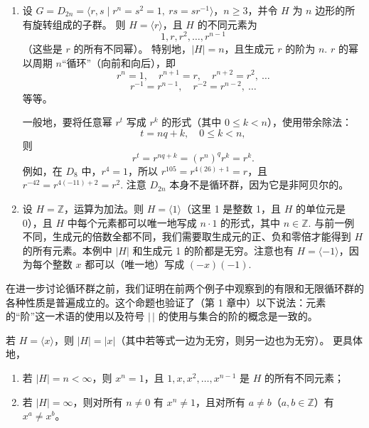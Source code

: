 \begin{example}
\begin{enumerate}[label=(\arabic*)]
\item 设 \( G = D_{2n} = \langle r, s \mid r^n = s^2 = 1,\ rs = sr^{-1} \rangle \)，\( n \geq 3 \)，并令 \( H \) 为 \( n \) 边形的所有旋转组成的子群。
则 \( H = \langle r \rangle \)，且 \( H \) 的不同元素为
\[
1, r, r^2, \ldots, r^{n-1}
\]
（这些是 \( r \) 的所有不同幂）。
特别地，\( |H| = n \)，且生成元 \( r \) 的阶为 \( n \). 
\( r \) 的幂以周期 \( n \)“循环”（向前和向后），即
\[
r^n = 1,\quad r^{n+1} = r,\quad r^{n+2} = r^2,\ \ldots
\]
\[
r^{-1} = r^{n-1},\quad r^{-2} = r^{n-2},\ \ldots
\]
等等。

一般地，要将任意幂 \( r^t \) 写成 \( r^k \) 的形式（其中 \( 0 \leq k < n \)），使用带余除法：
\[
t = nq + k,\quad 0 \leq k < n,
\]
则
\[
r^t = r^{nq+k} = (r^n)^q r^k = r^k.
\]
例如，在 \( D_8 \) 中，\( r^4 = 1 \)，所以 \( r^{105} = r^{4(26)+1} = r \)，且 \( r^{-42} = r^{4(-11)+2} = r^2 \). 注意 \( D_{2n} \) 本身不是循环群，因为它是非阿贝尔的。

\item 设 \( H = \mathbb{Z} \)，运算为加法。则 \( H = \langle 1 \rangle \)（这里 1 是整数 1，且 \( H \) 的单位元是 0），且 \( H \) 中每个元素都可以唯一地写成 \( n \cdot 1 \) 的形式，其中 \( n \in \mathbb{Z} \). 与前一例不同，生成元的倍数全都不同，我们需要取生成元的正、负和零倍才能得到 \( H \) 的所有元素。本例中 \( |H| \) 和生成元 1 的阶都是无穷。注意也有 \( H = \langle -1 \rangle \)，因为每个整数 \( x \) 都可以（唯一地）写成 \( (-x)(-1) \).
\end{enumerate}
\end{example}

在进一步讨论循环群之前，我们证明在前两个例子中观察到的有限和无限循环群的各种性质是普遍成立的。这个命题也验证了（第 1 章中）以下说法：元素的“阶”这一术语的使用以及符号 \(|\,|\) 的使用与集合的阶的概念是一致的。

\begin{proposition}
若 \(H = \langle x \rangle\)，则 \(|H| = |x|\)（其中若等式一边为无穷，则另一边也为无穷）。
更具体地，
\begin{enumerate}[label=(\arabic*)]
\item 若 \(|H| = n < \infty\)，则 \(x^n = 1\)，且 \(1, x, x^2, \ldots, x^{n-1}\) 是 \(H\) 的所有不同元素；
\item 若 \(|H| = \infty\)，则对所有 \(n \neq 0\) 有 \(x^n \neq 1\)，且对所有 \(a \neq b\)（\(a, b \in \mathbb{Z}\)）有 \(x^a \neq x^b\)。
\end{enumerate}
\end{proposition}


